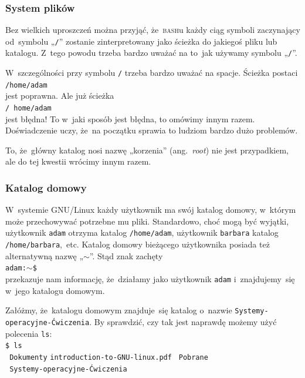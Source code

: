 \documentclass[10pt,t]{beamer}
\begin{document}
\begin{frame}
  \frametitle{System plików}


  Bez wielkich uproszczeń można przyjąć, że~\textsc{bash}u \alert{każdy}
  ciąg symboli zaczynający od~symbolu „\texttt{/}” zostanie zinterpretowany
  jako ścieżka do jakiegoś pliku lub katalogu. Z~tego powodu trzeba
  \alert{bardzo} uważać na to~jak używamy symbolu „\texttt{/}”.

  W~szczególności przy symbolu \texttt{/} trzeba bardzo uważać na spacje.
  Ścieżka postaci \\
  \texttt{/home/adam} \\
  jest poprawna. Ale już ścieżka \\
  \texttt{/ home/adam} \\
  jest \alert{błędna}! To w~jaki sposób jest błędna, to omówimy innym
  razem. Doświadczenie uczy, że~na początku sprawia to ludziom
  bardzo dużo problemów.

  To, że~główny katalog nosi nazwę „korzenia” (ang.~\textit{root}) nie jest
  przypadkiem, ale do tej kwestii wrócimy innym razem.

\end{frame}





\begin{frame}
  \frametitle{Katalog domowy}


  W~systemie GNU/Linux każdy użytkownik ma swój katalog domowy, w~którym
  może przechowywać potrzebne mu pliki. Standardowo, choć mogą być wyjątki,
  użytkownik \texttt{adam} otrzyma katalog \texttt{/home/adam}, użytkownik
  \texttt{barbara} katalog \texttt{/home/barbara},~etc. Katalog domowy
  bieżącego użytkownika posiada też alternatywną nazwę „$\sim$”. Stąd znak
  zachęty \\
  \texttt{adam:$\sim$\$} \\
  przekazuje nam informację, że~działamy jako użytkownik \texttt{adam}
  i~znajdujemy~się w~jego katalogu domowym.

  Załóżmy, że~katalogu domowym znajduje~się katalog o~nazwie
  \texttt{Systemy-operacyjne-Ćwiczenia}. By sprawdzić, czy tak jest
  naprawdę możemy użyć polecenia \texttt{ls}: \\
  \texttt{\$ ls} \\
  \texttt{{\color{jAxisBlue} Dokumenty}} \quad
  \texttt{introduction-to-GNU-linux.pdf} \quad
  \texttt{{\color{jAxisBlue} Pobrane}} \\
  \texttt{{\color{jAxisBlue} Systemy-operacyjne-Ćwiczenia}} \\

\end{frame}
\end{document}
